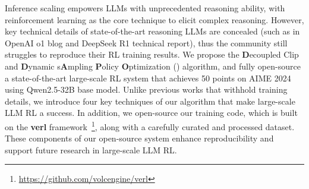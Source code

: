 
Inference scaling empowers LLMs with unprecedented reasoning ability, with reinforcement learning as the core technique to elicit complex reasoning. However, key technical details of state-of-the-art reasoning LLMs are concealed (such as in OpenAI o1 blog and DeepSeek R1 technical report), thus the community still struggles to reproduce their RL training results.
We propose the \textbf{D}ecoupled Clip and \textbf{D}ynamic s\textbf{A}mpling \textbf{P}olicy \textbf{O}ptimization (\method) algorithm, and fully open-source a state-of-the-art large-scale RL system that achieves 50 points on AIME 2024 using Qwen2.5-32B base model.
Unlike previous works that withhold training details, we introduce four key techniques of our algorithm that make large-scale LLM RL a success. In addition, we open-source our training code, which is built on the \textbf{verl} framework~\footnote{\url{https://github.com/volcengine/verl}}, along with a carefully curated and processed dataset. These components of our open-source system enhance reproducibility and support future research in large-scale LLM RL.
